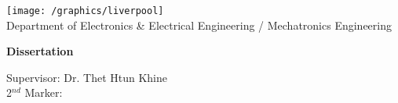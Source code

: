 \makeatletter
\begin{titlepage}
\thispagestyle{title}
\linespread{1}
	\flushleft
	\texttt{[image: /graphics/liverpool]} \\
	Department of Electronics \& Electrical Engineering / Mechatronics Engineering

	\vspace{1.5in}
  
	\huge{\textbf{\@title}}


	\vspace{1.5in}

	\textbf{Dissertation}

	\vspace{1.5in}

	\textbf{\@author}

	\vspace{0.5in}
	{
    \large
		Supervisor: Dr. Thet Htun Khine\\
		2$^{nd}$ Marker:
	}
\end{titlepage}
\makeatother
